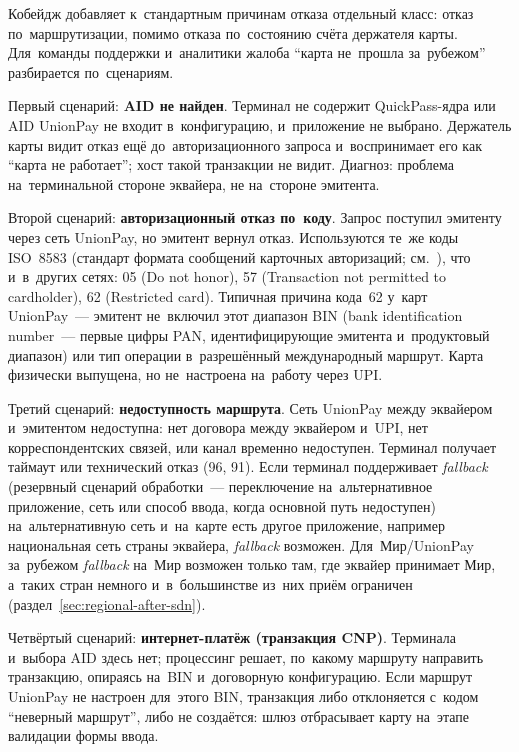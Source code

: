 Кобейдж добавляет к~стандартным причинам отказа отдельный класс: отказ
по~маршрутизации, помимо отказа по~состоянию счёта держателя
карты. Для~команды поддержки и~аналитики жалоба \enquote{карта не~прошла
за~рубежом} разбирается по~сценариям.

Первый сценарий: \textbf{AID не найден}. Терминал не содержит QuickPass-ядра или
AID UnionPay не входит в~конфигурацию, и~приложение не выбрано. Держатель карты
видит отказ ещё до~авторизационного запроса и~воспринимает его как \enquote{карта
не работает}; хост такой транзакции не видит. Диагноз: проблема
на~терминальной стороне эквайера, не на~стороне эмитента.

Второй сценарий: \textbf{авторизационный отказ по~коду}. Запрос поступил эмитенту
через сеть UnionPay, но эмитент вернул отказ. Используются те~же коды ISO~8583
(стандарт формата сообщений карточных авторизаций; см.~\cite{iso-8583-2023}),
что и~в~других сетях: 05 (Do not honor), 57 (Transaction not permitted to
cardholder), 62 (Restricted card). Типичная причина кода~62 у~карт UnionPay~---
эмитент не~включил этот диапазон BIN (bank identification number~--- первые
цифры PAN, идентифицирующие эмитента и~продуктовый диапазон) или тип операции
в~разрешённый международный маршрут. Карта физически выпущена, но не~настроена
на~работу через UPI.

Третий сценарий: \textbf{недоступность маршрута}. Сеть UnionPay между эквайером
и~эмитентом недоступна: нет договора между эквайером и~UPI, нет
корреспондентских связей, или канал временно недоступен. Терминал получает
таймаут или технический отказ (96, 91). Если терминал поддерживает
\textit{fallback} (резервный сценарий обработки~--- переключение
  на~альтернативное приложение, сеть или способ ввода, когда основной путь
недоступен) на~альтернативную сеть и~на~карте есть другое приложение, например
национальная сеть страны эквайера, \textit{fallback} возможен. Для~Мир/UnionPay
за~рубежом \textit{fallback} на~Мир возможен только там, где эквайер
принимает Мир, а~таких стран немного и~в~большинстве из~них приём
ограничен (раздел~\ref{sec:regional-after-sdn}).

Четвёртый сценарий: \textbf{интернет-платёж (транзакция CNP)}. Терминала
и~выбора AID здесь нет; процессинг решает, по~какому маршруту направить
транзакцию, опираясь на~BIN и~договорную конфигурацию. Если
маршрут UnionPay не настроен для~этого BIN, транзакция либо отклоняется с~кодом
\enquote{неверный маршрут}, либо не создаётся: шлюз отбрасывает карту на~этапе
валидации формы ввода.

